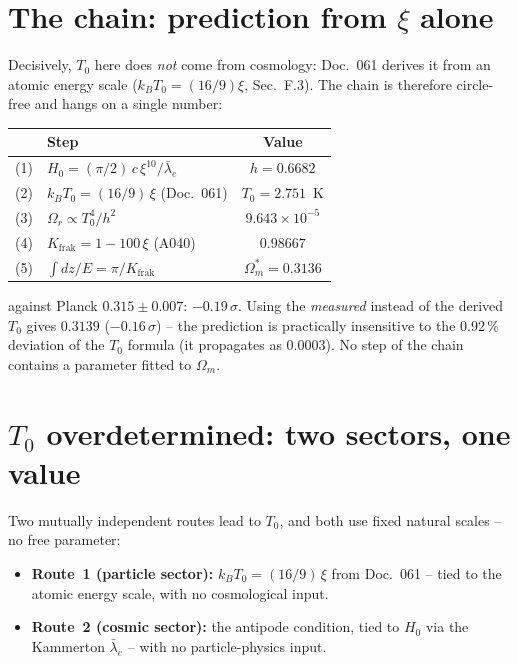 \documentclass[11pt]{report}
\begin{document}
\section{The chain: prediction from $\xi$ alone}

Decisively, $T_0$ here does \emph{not} come from cosmology:
Doc.~061 derives it from an atomic energy scale
($k_BT_0 = (16/9)\xi$, Sec.~F.3). The chain is therefore
circle-free and hangs on a single number:

\begin{center}
\begin{tabular}{clc}
\toprule
 & Step & Value \\
\midrule
(1) & $H_0 = (\pi/2)\,c\,\xi^{10}/\bar\lambda_e$ & $h = 0.6682$ \\
(2) & $k_BT_0 = (16/9)\,\xi$ (Doc.~061) & $T_0 = 2.751$~K \\
(3) & $\Omega_r \propto T_0^4/h^2$ & $9.643\times10^{-5}$ \\
(4) & $K_\text{frak} = 1-100\,\xi$ (A040) & $0.98667$ \\
(5) & $\int dz/E = \pi/K_\text{frak}$ &
  $\boxed{\Omega_m^{*} = 0.3136}$ \\
\bottomrule
\end{tabular}
\end{center}

\noindent against Planck $0.315 \pm 0.007$: $-0.19\,\sigma$.
Using the \emph{measured} instead of the derived $T_0$ gives
$0.3139$ ($-0.16\,\sigma$) -- the prediction is practically
insensitive to the $0.92\,\%$ deviation of the $T_0$ formula (it
propagates as $0.0003$). No step of the chain contains a parameter
fitted to $\Omega_m$.

\section{$T_0$ overdetermined: two sectors, one value}

Two mutually independent routes lead to $T_0$, and both use fixed
natural scales -- no free parameter:

\begin{itemize}
  \item \textbf{Route~1 (particle sector):}
        $k_BT_0 = (16/9)\,\xi$ from Doc.~061 -- tied to the
        atomic energy scale, with no cosmological input.
  \item \textbf{Route~2 (cosmic sector):} the antipode
        condition, tied to $H_0$ via the Kammerton
        $\bar\lambda_e$ -- with no particle-physics input.
\end{itemize}
\end{document}
